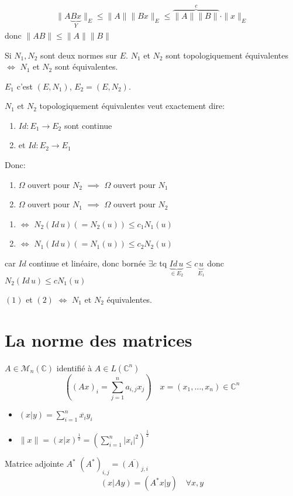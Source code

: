 \begin{preuve}
   \begin{align*}
       \|A\underbrace{Bx}_{Y}\|_{E} \le \|A\|\|Bx\|_{E} \le \overbrace{\|A\|\|B\|}^{c} \cdot \|x\|_{E}
   \end{align*} 
    donc $\|AB\| \le \|A\| \|B\|$
\end{preuve}
\begin{theorem}
    Si $N_1, N_2$ sont deux normes sur $E$.  $N_1$ et $N_2$ sont topologiquement équivalentes $\iff$ $N_1$ et $N_2$ sont équivalentes.
\end{theorem}
\begin{preuve}
   $E_1$ c'est $(E, N_1)$, $E_2 = (E, N_2)$.
   \par
   $N_1$ et $N_2$ topologiquement équivalentes veut exactement dire:
   \begin{enumerate}
       \item $Id: E_1 \to E_2$ sont continue 
       \item et $Id: E_2 \to E_1$
   \end{enumerate}
   Donc:
   \begin{enumerate}
       \item $\Omega$ ouvert  pour $N_2$ $\implies$ $\Omega$ ouvert  pour  $N_1$
       \item $\Omega$ ouvert  pour $N_1$ $\implies$ $\Omega$ ouvert pour  $N_2$
   \end{enumerate}

   \begin{enumerate}
       \item $\iff$ $N_2(Id \, u) (= N_2(u)) \le c_1N_1(u)$
       \item $\iff$ $N_1(Id \, u) (= N_1(u)) \le c_2N_2(u)$
   \end{enumerate}
   car $Id$ continue et linéaire, donc bornée  $\exists c$ tq $\underbrace{Id \, u}_{\in E_2} \le c \underbrace{u}_{E_1}$ donc $N_2(Id \, u) \le c N_1(u)$
   \par
   $(1)$ et  $(2)$  $\iff$ $N_1$ et $N_2$ équivalentes.
\end{preuve}

\section{La norme des matrices}
$A \in \mathcal{M}_n(\mathbb{C})$ identifié à $A \in L(\mathbb{C}^n)$
\[
    \left( (Ax)_{i} = \sum_{j=1}^{n} a_{i, j}x_j \right) \quad x = (x_1, \ldots, x_n) \in \mathbb{C}^n
\] 
\begin{itemize}
    \item $(x|y) = \sum_{i=1}^{n} \overline{x_i}y_i$
    \item $\|x\| = (x|x)^{\frac{1}{2}} = \left( \sum_{i=1}^{n} |x_i|^2 \right)^{\frac{1}{2}}$
\end{itemize}
Matrice adjointe $A^*$  $(A^*)_{i,j} = \overline{(A)_{j,i}}$
 \[
     (x|Ay) = (A^*x|y) \quad \forall x,y
 \] 
